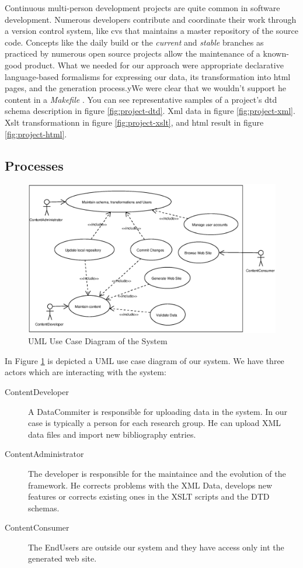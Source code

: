 \documentclass[10pt]{article}
\begin{document}
Continuous multi-person development projects are quite
common in software development.
Numerous developers contribute and coordinate their work
through a version control system, like {\sc cvs} that
maintains a master repository of the source code.
Concepts like the daily build \cite{CS95b} or the
{\em current} and {\em stable} branches as practiced by
numerous open source projects allow the maintenance
of a known-good product.
What we needed for our approach were appropriate
declarative language-based formalisms for expressing our data,
its transformation into {\sc html} pages, and the
generation process.yWe were clear that we wouldn't support he content in a {\em Makefile} \cite{OTT91}.
You can see representative samples of a project's
{\sc dtd} schema description in figure \ref{fig:project-dtd}.
{\sc Xml} data in figure \ref{fig:project-xml}.
{\sc Xslt} transformationn in figure \ref{fig:project-xslt},
and {\sc html} result in figure \ref{fig:project-html}.

\subsection{Processes}

\begin{figure}
\includegraphics[scale=0.5]{use-case-diagram}
\caption{UML Use Case Diagram of the System}
\label{fig:use-case-diagram}
\end{figure}

In Figure \ref{fig:use-case-diagram} is depicted a UML use case diagram of our system. 
We have three actors which are interacting with the system:

\begin{description}
\item[ContentDeveloper] A DataCommiter is responsible for uploading data in the system. In our case is typically a person
for each research group. He can upload XML data files and import new bibliography entries.

\item[ContentAdministrator] The developer is responsible for the maintaince and the evolution of the framework. He corrects problems with the XML Data, develops new features or corrects existing ones in the XSLT scripts and the DTD schemas.

\item[ContentConsumer] The EndUsers are outside our system and they have access only int the generated web site.
\end{description}
\end{document}

